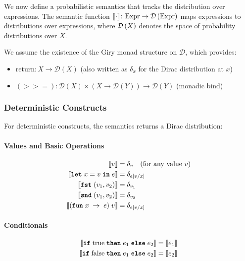 We now define a probabilistic semantics that tracks the distribution over expressions. The semantic function $\llbracket \cdot \rrbracket \colon \text{Expr} \rightarrow \mathcal{D}\left( \text{Expr} \right)$ maps expressions to distributions over expressions, where $\mathcal{D}\left( X \right)$ denotes the space of probability distributions over $X$.

We assume the existence of the Giry monad structure on $\mathcal{D}$, which provides:
\begin{itemize}
    \item $\text{return} : X \rightarrow \mathcal{D}(X)$ (also written as $\delta_x$ for the Dirac distribution at $x$)
    \item $(>>=) : \mathcal{D}(X) \times (X \rightarrow \mathcal{D}(Y)) \rightarrow \mathcal{D}(Y)$ (monadic bind)
\end{itemize}

\subsubsection{Deterministic Constructs}

For deterministic constructs, the semantics returns a Dirac distribution:

\paragraph{Values and Basic Operations}
\begin{align*}
\llbracket v \rrbracket &= \delta_v \quad \text{(for any value } v \text{)} \\
\llbracket \text{\ttfamily\bfseries let} \; x = v \; \text{\ttfamily\bfseries in} \; e \rrbracket &= \delta_{e[v/x]} \\
\llbracket  \text{\ttfamily\bfseries fst} \; (v_1, v_2)  \rrbracket &= \delta_{v_1} \\
\llbracket  \text{\ttfamily\bfseries snd} \; (v_1, v_2)  \rrbracket &= \delta_{v_2} \\
\llbracket  (\text{\ttfamily\bfseries fun} \; x \; \rightarrow \; e) \; v  \rrbracket &= \delta_{e[v/x]}
\end{align*}

\paragraph{Conditionals}
\begin{align*}
\llbracket  \text{\ttfamily\bfseries if} \; \text{true} \; \text{\ttfamily\bfseries then} \; e_1 \; \text{\ttfamily\bfseries else} \; e_2  \rrbracket &= \llbracket e_1 \rrbracket \\
\llbracket  \text{\ttfamily\bfseries if} \; \text{false} \; \text{\ttfamily\bfseries then} \; e_1 \; \text{\ttfamily\bfseries else} \; e_2  \rrbracket &= \llbracket e_2 \rrbracket
\end{align*}

